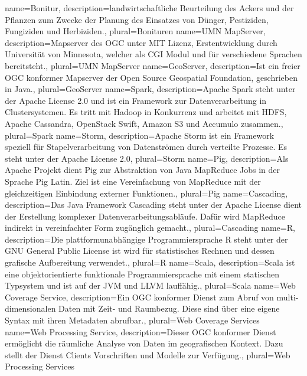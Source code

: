 {
  name=Bonitur,
  description={landwirtschaftliche Beurteilung des Ackers und der Pflanzen zum Zwecke der Planung des Einsatzes von Dünger, Pestiziden, Fungiziden und Herbiziden.},
  plural=Bonituren
}
{
  name=UMN MapServer,
  description={Mapserver des OGC unter MIT Lizenz, Erstentwicklung durch Universität von Minnesota, welcher als CGI Modul und für verschiedene Sprachen  bereitsteht.},
  plural=UMN MapServer
}
{
  name=GeoServer,
  description={Ist ein freier OGC konformer Mapserver der Open Source Geospatial Foundation, geschrieben in Java.},
  plural=GeoServer
}
{
  name=Spark,
  description={Apache Spark steht unter der Apache License 2.0 und ist ein Framework zur Datenverarbeitung in Clustersystemen. Es tritt mit Hadoop in Konkurrenz und arbeitet mit HDFS, Apache Cassandra, OpenStack Swift, Amazon S3 und Accumulo zusammen.},
  plural=Spark
}
{
  name=Storm,
  description={Apache Storm ist ein Framework speziell für Stapelverarbeitung von Datenströmen durch verteilte Prozesse. Es steht unter der Apache License 2.0},
  plural=Storm
}
{
  name=Pig,
  description={Als Apache Projekt dient Pig zur Abstraktion von Java MapReduce Jobs in der Sprache Pig Latin. Ziel ist eine Vereinfachung von MapReduce mit der gleichzeitigen Einbindung externer Funktionen.},
  plural=Pig
}
{
  name=Cascading,
  description={Das Java Framework Cascading steht unter der Apache License dient der Erstellung komplexer Datenverarbeitungsabläufe. Dafür wird MapReduce indirekt in vereinfachter Form zugänglich gemacht.},
  plural=Cascading
}
{
  name=R,
  description={Die plattformunabhängige Programmiersprache R steht unter der GNU General Public License ist wird für statistisches Rechnen und dessen grafische Aufbereitung verwendet.},
  plural=R
}
{
  name=Scala,
  description={Scala ist eine objektorientierte funktionale Programmiersprache mit einem statischen Typsystem und ist auf der JVM und LLVM lauffähig.},
  plural=Scala
}
{
  name=Web Coverage Service,
  description={Ein OGC konformer Dienst zum Abruf von multi-dimensionalen Daten mit Zeit- und Raumbezug. Diese sind über eine eigene Syntax mit ihren Metadaten abrufbar.},
  plural=Web Coverage Services
}
{
  name=Web Processing Service,
  description={Dieser OGC konformer Dienst ermöglicht die räumliche Analyse von Daten im geografischen Kontext. Dazu stellt der Dienst Clients Vorschriften und Modelle zur Verfügung.},
  plural=Web Processing Services
}
